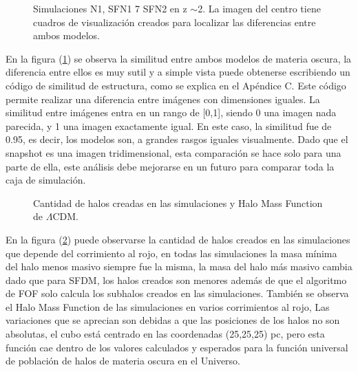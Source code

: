 \documentclass[a4paper,openright,12pt]{book}
\begin{document}
\begin{figure}
\centering
{}
\caption{\footnotesize{Simulaciones N1, SFN1 7 SFN2 en z $\sim $2. La imagen del centro tiene cuadros de visualización creados para localizar las diferencias entre ambos modelos.}}\label{fig 4.10}
\end{figure}

En la figura (\ref{fig 4.10}) se observa la similitud entre ambos modelos de materia oscura, la diferencia entre ellos es muy sutil y a simple vista puede obtenerse escribiendo un código de similitud de estructura, como se explica en el Apéndice C. Este código permite realizar una diferencia entre imágenes con dimensiones iguales. La similitud entre imágenes entra en un rango de [0,1], siendo 0 una imagen nada parecida, y 1 una imagen exactamente igual. En este caso, la similitud fue de 0.95, es decir, los modelos son, a grandes rasgos iguales visualmente. Dado que el \textsf{snapshot} es una imagen tridimensional, esta comparación se hace solo para una parte de ella, este análisis debe mejorarse en un futuro para comparar toda la caja de simulación.

\begin{figure}
\flushleft
{}
\caption{\footnotesize{Cantidad de halos creadas en las simulaciones y Halo Mass Function de $\Lambda$CDM.}}\label{fig 4.11}
\end{figure}

En la figura (\ref{fig 4.11}) puede observarse la cantidad de halos creados en las simulaciones que depende del corrimiento al rojo, en todas las simulaciones la masa mínima del halo menos masivo siempre fue la misma, la masa del halo más masivo cambia dado que para SFDM, los halos creados son menores además de que el algoritmo de FOF solo calcula los subhalos creados en las simulaciones. También se observa el Halo Mass Function de las simulaciones en varios corrimientos al rojo, Las variaciones que se aprecian son debidas a que las posiciones de los halos no son absolutas, el cubo está centrado en las coordenadas (25,25,25) pc, pero esta función cae dentro de los valores calculados y esperados para la función universal de población de halos de materia oscura en el Universo.
\end{document}

